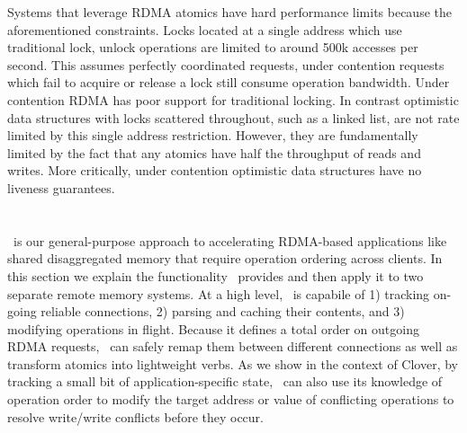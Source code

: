 Systems that leverage RDMA atomics have hard performance
limits because the aforementioned constraints.  Locks
located at a single address which use traditional lock,
unlock operations are limited to around 500k accesses per
second. This assumes perfectly coordinated requests, under
contention requests which fail to acquire or release a lock
still consume operation bandwidth.
Under contention RDMA has poor support for traditional
locking. In contrast optimistic data structures with locks
scattered throughout, such as a linked list, are not rate
limited by this single address restriction.  However, they
are fundamentally limited by the fact that any atomics have
half the throughput of reads and writes. More critically,
under contention optimistic data structures have no liveness
guarantees.





\section{\sword}

\sword\ is our general-purpose approach to accelerating RDMA-based
applications like shared disaggregated memory that require operation
ordering across clients.  In this section we explain the functionality
\sword\ provides and then apply it to two separate remote memory
systems.  At a high level, \sword\ is capabile of 1) tracking on-going
reliable connections, 2) parsing and caching their contents, and 3)
modifying operations in flight.  Because it defines a total order on
outgoing RDMA requests, \sword\ can safely remap them between
different connections as well as transform atomics into lightweight
verbs.  As we show in the context of Clover, by tracking a small bit
of application-specific state, \sword\ can also use its knowledge of
operation order to modify the target address or value of conflicting
operations to resolve write/write conflicts before they occur.


